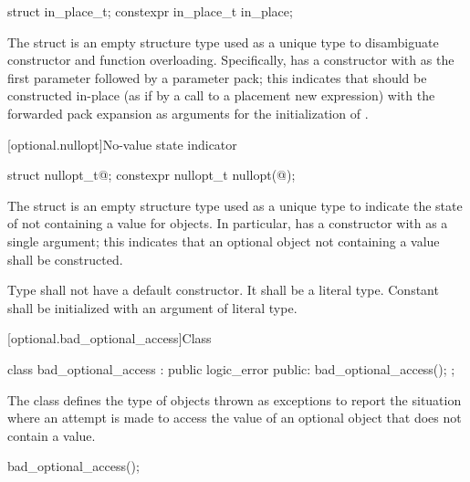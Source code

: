 %
%
\begin{itemdecl}
struct in_place_t{};
constexpr in_place_t in_place{};
\end{itemdecl}

\pnum
The struct  is an empty structure type used as a unique type to disambiguate constructor and function overloading.
Specifically,  has a constructor with  as the first parameter followed by a parameter pack;
this indicates that  should be constructed in-place (as if by a call to a placement new expression) with the forwarded pack expansion as arguments for the initialization of .

[optional.nullopt]{No-value state indicator}

%
%
\begin{itemdecl}
struct nullopt_t{@\seebelow@};
constexpr nullopt_t nullopt(@\unspec@);
\end{itemdecl}

\pnum
The struct  is an empty structure type used as a unique type to indicate the state of not containing a value for  objects.
In particular,  has a constructor with  as a single argument;
this indicates that an optional object not containing a value shall be constructed.

\pnum
Type  shall not have a default constructor. It shall be a literal type. Constant  shall be initialized with an argument of literal type.

[optional.bad_optional_access]{Class }

\begin{codeblock}
class bad_optional_access : public logic_error {
public:
  bad_optional_access();
};
\end{codeblock}

\pnum
The class  defines the type of objects thrown as exceptions to report the situation where an attempt is made to access the value of an optional object that does not contain a value.

%
\begin{itemdecl}
bad_optional_access();
\end{itemdecl}


